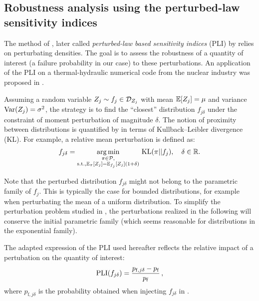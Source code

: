 \subsection{Robustness analysis using the perturbed-law sensitivity indices}\label{sec:owt_robustness}
The method of \citet{lemaitre_2015_PLI}, later called \textit{perturbed-law based sensitivity indices} (PLI) by \citet{sueur_2017_PLI} relies on perturbating densities. 
The goal is to assess the robustness of a quantity of interest (a failure probability in our case) to these perturbations. 
An application of the PLI on a thermal-hydraulic numerical code from the nuclear industry was proposed in \citet{iooss_2022_pli}. 

Assuming a random variable $Z_j \sim f_j \in \mathcal{D}_{Z_j}$ with mean $\mathbb{E}[Z_j]=\mu$ and variance $\operatorname{Var}(Z_j) = \sigma^2$, the strategy is to find the ``closest'' distribution $f_{j \delta}$ under the constraint of moment perturbation of magnitude $\delta$.  
The notion of proximity between distributions is quantified by \citet{lemaitre_2015_PLI} in terms of Kullback–Leibler divergence (KL). 
For example, a relative mean perturbation is defined as: 
\begin{eqnarray}
    f_{j \delta} = \operatorname*{arg\,min}_{\substack{\pi\in \mathcal{P}, \\ \mathrm{s.t.}, \mathbb{E}_\pi[Z_j] = \mathbb{E}_{f_j}[Z_j](1 + \delta)}} \, \mathrm{KL}(\pi||f_j), \quad \delta \in \mathbb{R}. 
\end{eqnarray} 

Note that the perturbed distribution $f_{j \delta}$ might not belong to the parametric family of $f_j$. 
This is typically the case for bounded distributions, for example when perturbating the mean of a uniform distribution.  
To simplify the perturbation problem studied in \citet{lemaitre_2015_PLI, gauchy_2022_PLI}, the perturbations realized in the following will conserve the initial parametric family (which seems reasonable for distributions in the exponential family). 

The adapted expression of the PLI used hereafter \citep{gauchy_2022_PLI} reflects the relative impact of a pertubation on the quantity of interest: 
\begin{equation}
    \mathrm{PLI}(f_{j \delta}) = \frac{p_{\mathrm{f}, j \delta} - p_\mathrm{f} }{p_\mathrm{f}} \,,
\end{equation}
where $p_{\mathrm{f}, j \delta}$ is the probability obtained when injecting $f_{j \delta}$ in .

